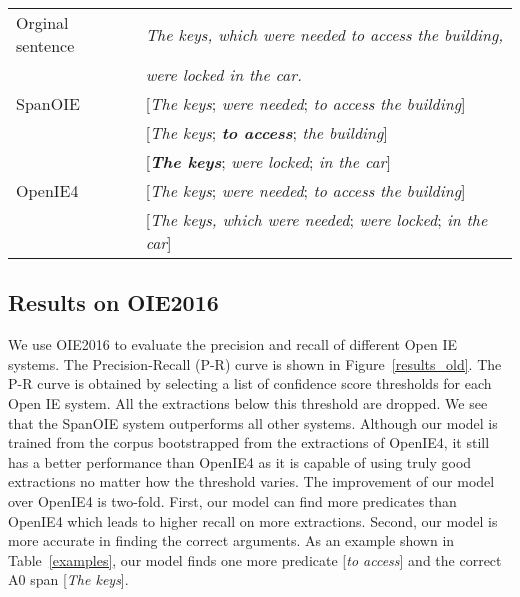 \documentclass[letterpaper]{article} \usepackage{aaai20}  \usepackage{times}  \usepackage{helvet} \usepackage{courier}  \usepackage[hyphens]{url}  \urlstyle{rm} \def\UrlFont{\rm}  \usepackage{graphicx}  \frenchspacing  \setlength{\pdfpagewidth}{8.5in}  \setlength{\pdfpageheight}{11in}
\begin{document}
\begin{table*}[t!]
\begin{center}
\begin{tabular}{|l|l|}
\hline 
Orginal sentence & \emph{The keys, which were needed to access the building,}\\
&  \emph{were locked in the car.}\\ 
\hline 
SpanOIE & [\emph{The keys}; \emph{were needed}; \emph{to access the building}]\\
         & [\emph{The keys}; \emph{\textbf{to access}}; \emph{the building}]\\
         & [\emph{\textbf{The keys}}; \emph{were locked}; \emph{in the car}]\\
\hline
OpenIE4 & [\emph{The keys}; \emph{were needed}; \emph{to access the building}]\\
         & [\emph{The keys, which were needed}; \emph{were locked}; \emph{in the car}]\\
\hline
\end{tabular}
\end{center}
\caption{Example of extractions from Span OIE and OpenIE 4}
\label{examples}
\end{table*}


\subsection{Results on OIE2016}
We use OIE2016 to evaluate the precision and recall of different Open IE systems. The Precision-Recall (P-R) curve is shown in Figure~\ref{results_old}. The P-R curve is obtained by selecting a list of confidence score thresholds for each Open IE system. All the extractions below this threshold are dropped. We see that the SpanOIE system outperforms all other systems. Although our model is trained from the corpus bootstrapped from the extractions of OpenIE4, it still has a better performance than OpenIE4 as it is capable of using truly good extractions no matter how the threshold varies. The improvement of our model over OpenIE4 is two-fold. First, our model can find more predicates than OpenIE4 which leads to higher recall on more extractions. Second, our model is more accurate in finding the correct arguments. As an example shown in Table~\ref{examples}, our model finds one more predicate [\emph{to access}] and the correct A0 span [\emph{The keys}].
\end{document}
